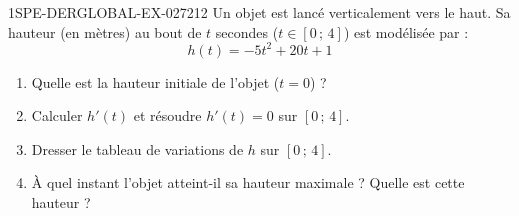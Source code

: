 \begin{exercice}{1SPE-DERGLOBAL-EX-027}{2}{12}
Un objet est lancé verticalement vers le haut. Sa hauteur (en mètres) au bout de $t$ secondes ($t \in [0\,;\,4]$) est modélisée par :
\[
h(t) = -5t^2 + 20t + 1
\]

\begin{enumerate}
\item Quelle est la hauteur initiale de l'objet ($t = 0$) ?
\item Calculer $h'(t)$ et résoudre $h'(t) = 0$ sur $[0\,;\,4]$.
\item Dresser le tableau de variations de $h$ sur $[0\,;\,4]$.
\item À quel instant l'objet atteint-il sa hauteur maximale ? Quelle est cette hauteur ?
\end{enumerate}
\end{exercice}
